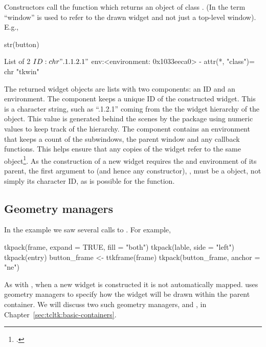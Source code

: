 Constructors call the  function which returns an
object of class . (In \TK\/ the term ``window'' is used to
refer to the drawn widget and not just a top-level window). E.g.,

\begin{Schunk}
\begin{Sinput}
 str(button)
\end{Sinput}
\begin{Soutput}
List of 2
 $ ID : chr ".1.1.2.1"
 $ env:<environment: 0x1033eeca0> 
 - attr(*, "class")= chr "tkwin"
\end{Soutput}
\end{Schunk}

The returned widget objects are lists with two components: an ID and an
environment. The  component keeps a unique ID of the
constructed widget. This is a character string, such as ``.1.2.1''
coming from the the widget hierarchy of the object. This value is
generated behind the scenes by the  package using numeric
values to keep track of the hierarchy. The  component
contains an environment that keeps a count of the subwindows, the parent
window and any callback functions. This helps ensure that any copies
of the widget refer to the same object\footcite{Dalgaard-DSC}. As the
construction of a new widget requires the  and environment of
its parent, the first argument to  (and hence any constructor), ,
must be a  object, not simply its character ID, as is
possible for the  function.


\subsection{Geometry managers}
\label{sec:tcltk:overview:geometry-managers}

In the example we saw several calls to . For example,

\begin{Schunk}
\begin{Sinput}
 tkpack(frame, expand = TRUE, fill = "both")
 tkpack(lable, side = "left")
 tkpack(entry)
 button_frame <- ttkframe(frame)
 tkpack(button_frame, anchor = "ne")
\end{Sinput}
\end{Schunk}


As with \Qt, when a new widget is constructed it is not automatically
mapped. \TK\/ uses geometry managers to specify how the widget will be
drawn within the parent container. We will discuss two such geometry
managers,  and , in Chapter~\ref{sec:tcltk:basic-containers}.


